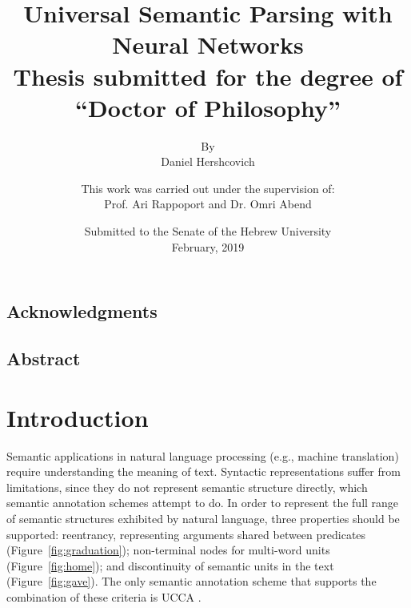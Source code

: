 \documentclass[12pt]{report}
\title{
\textbf{Universal Semantic Parsing with Neural Networks} \\
\vspace{2cm}
{\large Thesis submitted for the degree of \\
``Doctor of Philosophy''}
}
\author{
By \\
Daniel Hershcovich
\vspace{2cm}
}
\date{
Submitted to the Senate of the Hebrew University \\
February, 2019
}
\begin{document}
\maketitle
\maketitle
\clearpage
\title{}
\author{
This work was carried out under the supervision of: \\
Prof. Ari Rappoport and Dr. Omri Abend
}
\date{}
\maketitle

\section*{Acknowledgments}

\pagebreak

\section*{Abstract}

\pagebreak

\tableofcontents

\chapter{Introduction}

Semantic applications in natural language processing (e.g., machine translation)
require understanding the meaning of text.
Syntactic representations suffer from limitations, since they do not
represent semantic structure directly,
which semantic annotation schemes attempt to do.
In order to represent the full range of semantic structures exhibited by
natural language, three properties should be supported: reentrancy,
representing arguments shared between predicates (Figure~\ref{fig:graduation});
non-terminal nodes for multi-word units (Figure~\ref{fig:home});
and discontinuity of semantic units in the text (Figure~\ref{fig:gave}).
The only semantic annotation scheme that supports the combination of these criteria is UCCA
\citep{abend2013universal}.
\end{document}

